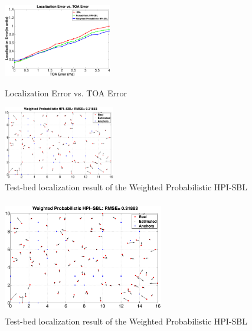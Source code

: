 \begin{figure}[!htb]
	\centering
	\begin{minipage}[t]{0.49\linewidth}
		\centering
		\setlength{\abovecaptionskip}{-15pt}
		\vspace{-0.5mm}
		\setlength{\belowcaptionskip}{-5pt}
		\includegraphics[height=3.2cm,width = 1.1\linewidth]{image/TOA.eps}
		\vspace{6mm}
		\caption{Localization Error vs. TOA Error}
		\label{fig5}
	\end{minipage}
	\begin{minipage}[t]{0.49\linewidth}
		\centering
		\setlength{\abovecaptionskip}{-15pt}
		\vspace{-0.5mm}
		\setlength{\belowcaptionskip}{-5pt}
		\includegraphics[height=3.2cm,width = 1.1\linewidth]{image/testbed.eps}
		\vspace{6mm}
		\caption{Test-bed localization result of the Weighted Probabilistic HPI-SBL}
		\label{fig6}
	\end{minipage}
	\vspace{-2mm}
\end{figure}

\iffalse

  \begin{figure}[htb]
             \centering
	     \vspace{-2mm}
             \includegraphics[height=5.0cm,width=7.0cm]{image/testbed.eps}
            \caption{Test-bed localization result of the Weighted Probabilistic HPI-SBL }
             \vspace{-5mm}
             \label{fig7}
        \end{figure}

